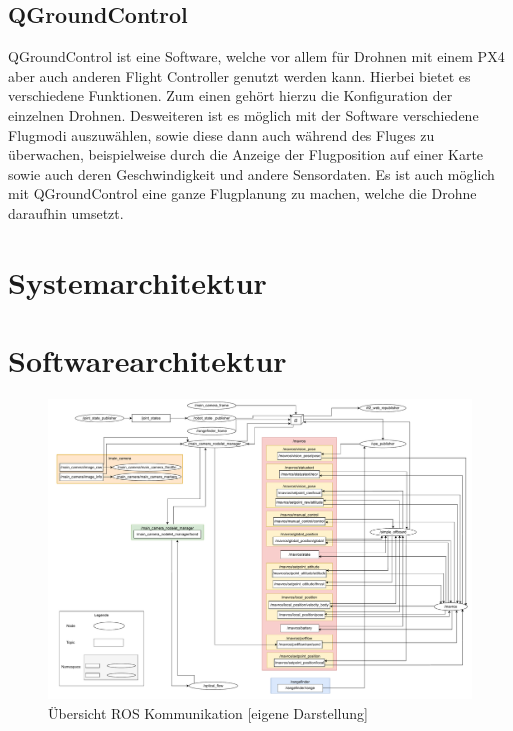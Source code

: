 \subsection{QGroundControl}  \label{qGroundControl:subsection}
QGroundControl ist eine Software, welche vor allem für Drohnen mit einem PX4 aber auch anderen Flight Controller genutzt werden kann. Hierbei bietet es verschiedene Funktionen. Zum einen gehört hierzu die Konfiguration der einzelnen  Drohnen. Desweiteren ist es möglich mit der Software verschiedene Flugmodi auszuwählen, sowie diese dann auch während des Fluges zu überwachen, beispielweise durch die Anzeige der Flugposition auf einer Karte sowie auch deren Geschwindigkeit und andere Sensordaten.
Es ist auch möglich mit QGroundControl eine ganze Flugplanung zu machen, welche die Drohne daraufhin umsetzt. \cite[vgl.][]{qGroundControl}


\section{Systemarchitektur}

\section{Softwarearchitektur}

    \begin{landscape}
        \begin{figure}
            \includegraphics[width=\paperwidth,keepaspectratio]{images/graph_ros.pdf}
            \caption[Übersicht ROS Kommunikation]{\label{img ros_communication} Übersicht ROS Kommunikation [eigene Darstellung]}
        \end{figure}
    \end{landscape}


